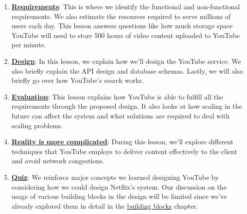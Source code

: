 \begin{enumerate}
\item
\protect{}\label{e-ITJ88Ucdv36kq-0SJsS}
\href{https://www.educative.io/courses/grokking-the-system-design-interview/requirements-of-youtubes-design}{\textbf{Requirements}}: This is where we identify the functional and non-functional requirements. We also estimate the resources required to serve millions of users each day. This lesson answers questions like how much storage space YouTube will need to store 500 hours of video content uploaded to YouTube per minute.
\item
\protect{}\label{jkga7-cAdHBFqWjtc7lv4}
\href{https://www.educative.io/courses/grokking-the-system-design-interview/design-of-youtube}{\textbf{Design}}: In this lesson, we explain how we'll design the YouTube service. We also briefly explain the API design and database schemas. Lastly, we will also briefly go over how YouTube's search works.
\item
\protect{}\label{3wzNipD02fiCfBVHR6K_4}
\href{https://www.educative.io/courses/grokking-the-system-design-interview/evaluation-of-youtubes-design}{\textbf{Evaluation}}: This lesson explains how YouTube is able to fulfill all the requirements through the proposed design. It also looks at how scaling in the future can affect the system and what solutions are required to deal with scaling problems.
\item
\protect{}\label{qwwKCVkJSbf_0dTuNYKLV}
\href{https://www.educative.io/courses/grokking-the-system-design-interview/the-reality-is-more-complicated}{\textbf{Reality is more complicated}}: During this lesson, we'll explore different techniques that YouTube employs to deliver content effectively to the client and avoid network congestions.
\item
\protect{}\label{3Ic8OOsv03Of16U1-JXkK}
\href{https://www.educative.io/courses/grokking-the-system-design-interview/quiz-on-youtubes-design}{\textbf{Quiz}}: We reinforce major concepts we learned designing YouTube by considering how we could design Netflix's system. Our discussion on the usage of various building blocks in the design will be limited since we've already explored them in detail in the \href{https://www.educative.io/courses/grokking-the-system-design-interview/introduction-to-building-blocks-for-modern-system-design}{building blocks} chapter.
\end{enumerate}

